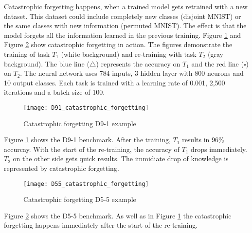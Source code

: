 Catastrophic forgetting happens, when a trained model gets retrained with a new dataset.
This dataset could include completely new classes (disjoint MNIST) or the same classes with new information (permuted MNIST).
The effect is that the model forgets all the information learned in the previous training.
\newline
Figure \ref{fig:catastrophic_forgetting_d91_example} and Figure \ref{fig:catastrophic_forgetting_d55_example} show catastrophic forgetting in action.
The figures demonstrate the training of task $T_1$ (white background) and re-training with task $T_2$ (gray background).
The blue line ($\triangle$) represents the accuracy on $T_1$ and the red line ($\square$) on $T_2$.
\newline
The neural network uses 784 inputs, 3 hidden layer with 800 neurons and 10 output classes.
Each task is trained with a learning rate of 0.001, 2,500 iterations and a batch size of 100.

\begin{figure}[H]
    \centering
    \texttt{[image: D91\_catastrophic\_forgetting]}
    \caption{Catastrophic forgetting D9-1 example}
    \label{fig:catastrophic_forgetting_d91_example}
\end{figure}

Figure \ref{fig:catastrophic_forgetting_d91_example} shows the D9-1 benchmark.
After the training, $T_1$ results in 96\% accurcay.
With the start of the re-training, the accuracy of $T_1$ drops immediately.
$T_2$ on the other side gets quick results.
\newline
The immidiate drop of knowledge is represented by catastrophic forgetting.

\begin{figure}[H]
    \centering
    \texttt{[image: D55\_catastrophic\_forgetting]}
    \caption{Catastrophic forgetting D5-5 example}
    \label{fig:catastrophic_forgetting_d55_example}
\end{figure}

Figure \ref{fig:catastrophic_forgetting_d55_example} shows the D5-5 benchmark.
As well as in Figure \ref{fig:catastrophic_forgetting_d91_example} the catastrophic forgetting happens immediately after the start of the re-training.

